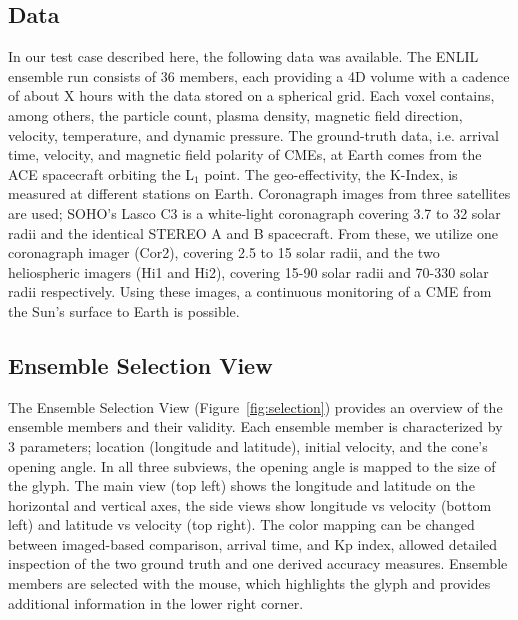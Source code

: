 \documentclass{vgtc}                          %
\begin{document}
\subsection{Data} \label{sec:data}
In our test case described here, the following data was available. The ENLIL ensemble run consists of 36 members, each providing a 4D volume with a cadence of about X hours with the data stored on a spherical grid. Each voxel contains, among others, the particle count, plasma density, magnetic field direction, velocity, temperature, and dynamic pressure. The ground-truth data, i.e. arrival time, velocity, and magnetic field polarity of CMEs, at Earth comes from the ACE spacecraft orbiting the L$_1$ point. The geo-effectivity, the K-Index, is measured at different stations on Earth. Coronagraph images from three satellites are used; SOHO's Lasco C3 is a white-light coronagraph covering 3.7 to 32 solar radii and the identical STEREO A and B spacecraft. From these, we utilize one coronagraph imager (Cor2), covering 2.5 to 15 solar radii, and the two heliospheric imagers (Hi1 and Hi2), covering 15-90 solar radii and 70-330 solar radii respectively. Using these images, a continuous monitoring of a CME from the Sun's surface to Earth is possible.

\subsection{Ensemble Selection View} \label{sec:selection}
The Ensemble Selection View (Figure~\ref{fig:selection}) provides an overview of the ensemble members and their validity. Each ensemble member is characterized by 3 parameters; location (longitude and latitude), initial velocity, and the cone's opening angle. In all three subviews, the opening angle is mapped to the size of the glyph. The main view (top left) shows the longitude and latitude on the horizontal and vertical axes, the side views show longitude vs velocity (bottom left) and latitude vs velocity (top right). The color mapping can be changed between imaged-based comparison, arrival time, and Kp index, allowed detailed inspection of the two ground truth and one derived accuracy measures. Ensemble members are selected with the mouse, which highlights the glyph and provides additional information in the lower right corner. 
\end{document}
